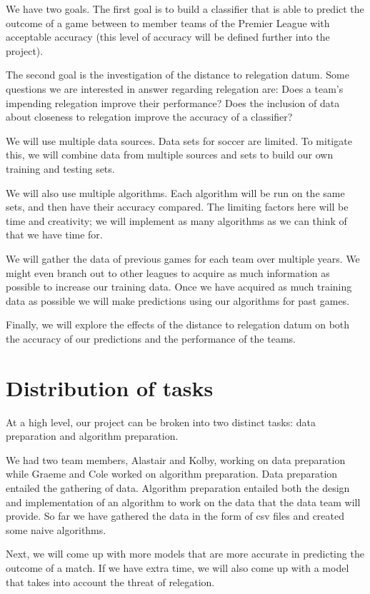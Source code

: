 \documentclass[conference]{IEEEtran}
\begin{document}
We have two goals. The first goal is to build a classifier that is  able to predict the outcome of a game between to member teams of the Premier League with acceptable accuracy (this level of accuracy will be defined further into the project).

The second goal is the investigation of the distance to relegation datum. Some questions we are interested in answer regarding relegation are:
Does a team's impending relegation improve their performance?
Does the inclusion of data about closeness to relegation improve the accuracy of a classifier?

We will use multiple data sources. Data sets for soccer are limited. To mitigate this, we will combine data from multiple sources and sets to build our own training and testing sets.

We will also use multiple algorithms. Each algorithm will be run on the same sets, and then have their accuracy compared.  The limiting factors here will be time and creativity; we will implement as many algorithms as we can think of that we have time for.

We will gather the data of previous games for each team over multiple years. We might even branch out to other leagues to acquire as much information as possible to increase our training data. Once we have acquired as much training data as possible we will make predictions using our algorithms for past games.

Finally, we will explore the effects of the distance to relegation datum on both the accuracy of our predictions and the performance of the teams.

\section{Distribution of tasks}
At a high level, our project can be broken into two distinct tasks: data preparation and algorithm preparation.

We had two team members, Alastair and Kolby, working on data preparation while Graeme and Cole worked on algorithm preparation.
Data preparation entailed the gathering of data. Algorithm preparation entailed both the design and implementation of an algorithm to work on the data that the data team will provide.
So far we have gathered the data in the form of csv files and created some naive algorithms.

Next, we will come up with more models that are more accurate in predicting the outcome of a match. If we have extra time, we will also come up with a model that takes into account the threat of relegation. 
\end{document}
